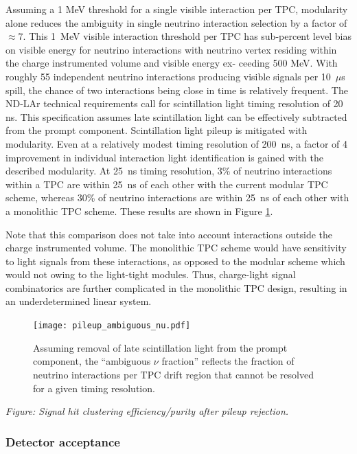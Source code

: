 Assuming a 1 MeV threshold for a single visible interaction per TPC, modularity alone reduces the ambiguity in single neutrino interaction selection by a factor of $\approx7$. This 1~MeV visible interaction threshold per TPC has sub-percent level bias on visible energy for neutrino interactions with neutrino vertex residing within the charge instrumented volume and visible energy ex- ceeding 500 MeV.
With roughly 55 independent neutrino interactions producing visible signals per 10~$\mu$s spill, the chance of two interactions being close in time is relatively frequent. The ND-LAr technical requirements call for scintillation light timing resolution of 20 ns. This specification assumes late scintillation light can be effectively subtracted from the prompt component. Scintillation light pileup is mitigated with modularity. Even at a relatively modest timing resolution of 200~ns, a factor of 4 improvement in individual interaction light identification is gained with the described modularity. At 25~ns timing resolution, 3\% of neutrino interactions within a TPC are within 25~ns of each other with the current modular TPC scheme, whereas 30\% of neutrino interactions are within 25~ns of each other with a monolithic TPC scheme. These results are shown in Figure \ref{fig:ndlar-ana-pileup}.

Note that this comparison does not take into account interactions outside the charge instrumented volume. The monolithic TPC scheme would have sensitivity to light signals from these interactions, as opposed to the modular scheme which would not owing to the light-tight modules. Thus, charge-light signal combinatorics are further complicated in the monolithic TPC design, resulting in an underdetermined linear system.

\begin{figure}
\centering
\texttt{[image: pileup\_ambiguous\_nu.pdf]}
\caption{Assuming removal of late scintillation light from the prompt component, the ``ambiguous $\nu$ fraction'' reflects the fraction of neutrino interactions per TPC drift region that cannot be resolved for a given timing resolution.}
\label{fig:ndlar-ana-pileup}
\end{figure}

{\it Figure: Signal hit clustering efficiency/purity after pileup rejection.}

\subsubsection{Detector acceptance}

